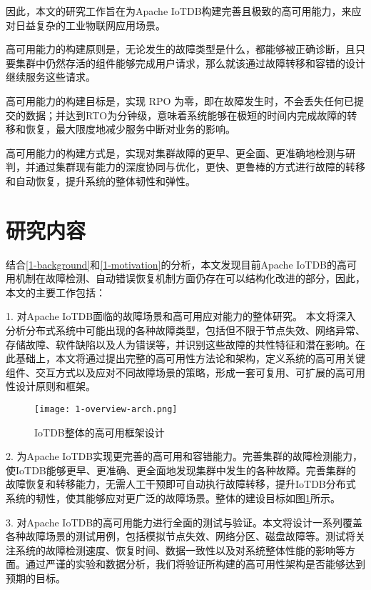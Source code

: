 因此，本文的研究工作旨在为Apache IoTDB构建完善且极致的高可用能力，来应对日益复杂的工业物联网应用场景。

高可用能力的构建原则是，无论发生的故障类型是什么，都能够被正确诊断，且只要集群中仍然存活的组件能够完成用户请求，那么就该通过故障转移和容错的设计继续服务这些请求。

高可用能力的构建目标是，实现 RPO 为零，即在故障发生时，不会丢失任何已提交的数据；并达到RTO为分钟级，意味着系统能够在极短的时间内完成故障的转移和恢复，最大限度地减少服务中断对业务的影响。

高可用能力的构建方式是，实现对集群故障的更早、更全面、更准确地检测与研判，并通过集群现有能力的深度协同与优化，更快、更鲁棒的方式进行故障的转移和自动恢复，提升系统的整体韧性和弹性。


\section{研究内容}

结合\ref{1-background}和\ref{1-motivation}的分析，本文发现目前Apache IoTDB的高可用机制在故障检测、自动错误恢复机制方面仍存在可以结构化改进的部分，因此，本文的主要工作包括：

1. 对Apache IoTDB面临的故障场景和高可用应对能力的整体研究。
本文将深入分析分布式系统中可能出现的各种故障类型，包括但不限于节点失效、网络异常、存储故障、软件缺陷以及人为错误等，并识别这些故障的共性特征和潜在影响。在此基础上，本文将通过提出完整的高可用性方法论和架构，定义系统的高可用关键组件、交互方式以及应对不同故障场景的策略，形成一套可复用、可扩展的高可用性设计原则和框架。


\begin{figure}
  \centering
  \texttt{[image: 1-overview-arch.png]}
  \caption{IoTDB整体的高可用框架设计}
  \label{fig:c01-overview-arch}
\end{figure}

2. 为Apache IoTDB实现更完善的高可用和容错能力。完善集群的故障检测能力，使IoTDB能够更早、更准确、更全面地发现集群中发生的各种故障。完善集群的故障恢复和转移能力，无需人工干预即可自动执行故障转移，提升IoTDB分布式系统的韧性，使其能够应对更广泛的故障场景。整体的建设目标如图\ref{fig:c01-overview-arch}所示。


3. 对Apache IoTDB的高可用能力进行全面的测试与验证。本文将设计一系列覆盖各种故障场景的测试用例，包括模拟节点失效、网络分区、磁盘故障等。测试将关注系统的故障检测速度、恢复时间、数据一致性以及对系统整体性能的影响等方面。通过严谨的实验和数据分析，我们将验证所构建的高可用性架构是否能够达到预期的目标。



